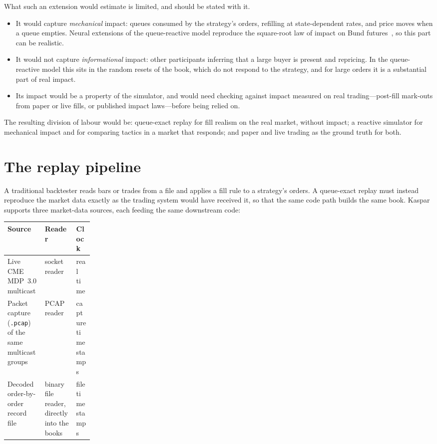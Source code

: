 What such an extension would estimate is limited, and should be stated with it.
\begin{itemize}[leftmargin=1.5em,itemsep=1pt]
\item It would capture \emph{mechanical} impact: queues consumed by the strategy's orders, refilling at
  state-dependent rates, and price moves when a queue empties. Neural extensions of the queue-reactive
  model reproduce the square-root law of impact on Bund futures~\citep{deepqr}, so this part can be
  realistic.
\item It would not capture \emph{informational} impact: other participants inferring that a large buyer is
  present and repricing. In the queue-reactive model this sits in the random resets of the book, which do
  not respond to the strategy, and for large orders it is a substantial part of real impact.
\item Its impact would be a property of the simulator, and would need checking against impact measured on
  real trading---post-fill mark-outs from paper or live fills, or published impact laws---before being
  relied on.
\end{itemize}
The resulting division of labour would be: queue-exact replay for fill realism on the real market, without
impact; a reactive simulator for mechanical impact and for comparing tactics in a market that responds;
and paper and live trading as the ground truth for both.

\section{The replay pipeline}
\label{sec:kaspar-pipeline}

A traditional backtester reads bars or trades from a file and applies a fill rule to a strategy's
orders. A queue-exact replay must instead reproduce the market data exactly as the trading system
would have received it, so that the same code path builds the same book. Kaspar supports three market-data
sources, each feeding the same downstream code:

\begin{center}\footnotesize
\begin{tabularx}{\linewidth}{>{\raggedright\arraybackslash}X>{\raggedright\arraybackslash}X>{\raggedright\arraybackslash}p{0.2\linewidth}}
\toprule
Source & Reader & Clock \\
\midrule
Live CME MDP~3.0 multicast & socket reader & real time \\
Packet capture (\texttt{.pcap}) of the same multicast groups & PCAP reader & capture timestamps \\
Decoded order-by-order record file & binary file reader, directly into the books & file timestamps \\
\bottomrule
\end{tabularx}
\end{center}


